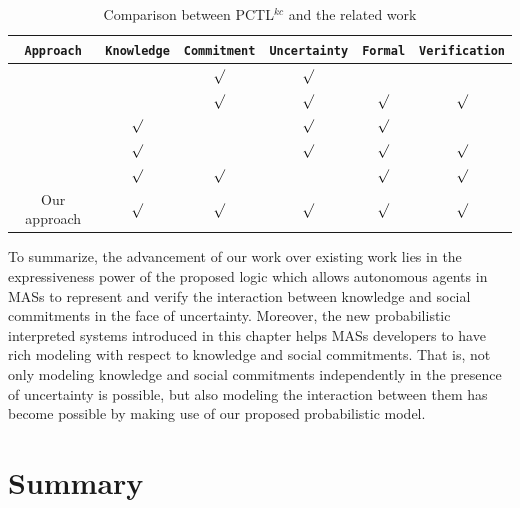 \begin{table}
\centering \caption{Comparison between PCTL$^{kc}$ and the related work } \label{table:comparison}
\begin{tabular}{cccccc}
\hline
\texttt{Approach}       &\texttt{Knowledge} & \texttt{Commitment} & \texttt{Uncertainty}   & \texttt{Formal} & \texttt{Verification}\\
\hline
\cite{Witwicki2007,Witwicki2009}    &         &$\surd$   &$\surd$    &         &    \\
\cite{Huang2011}      &          &$\surd$   &$\surd$    &$\surd$  &$\surd$    \\
\cite{Delgado2009}     &$\surd$   &          &$\surd$    &$\surd$  &    \\
\cite{Wan2013}         &$\surd$   &          &$\surd$    &$\surd$  &$\surd$    \\
\cite{Al-Saqqar2014a}   &$\surd$   &$\surd$   &           &$\surd$  &$\surd$    \\
Our approach         &$\surd$   &$\surd$   &$\surd$    &$\surd$  &$\surd$    \\
\hline

\end{tabular}
\end{table}

To summarize, the advancement of our work over existing work lies in the expressiveness power of the proposed logic which allows autonomous agents in MASs to represent and verify the interaction between knowledge and social commitments in the face of uncertainty. Moreover, the new probabilistic interpreted systems introduced in this chapter helps MASs developers to have rich modeling with respect to knowledge and social commitments. That is, not only modeling knowledge and social commitments independently in the presence of uncertainty is possible, but also modeling the interaction between them has become possible by making use of our proposed probabilistic model.



\section{Summary}\label{sec:conclusion-cha4}

